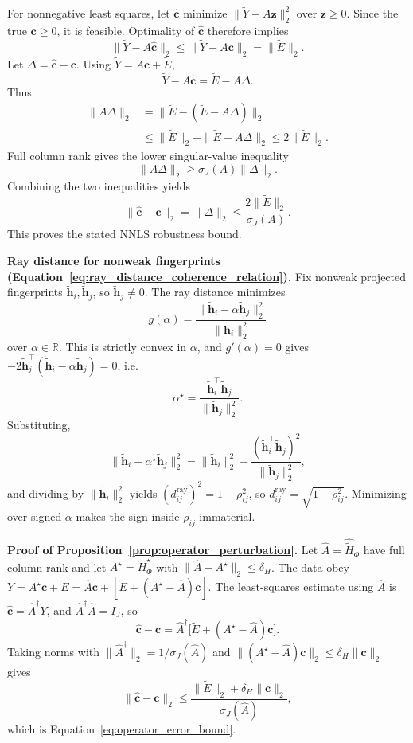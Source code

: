 For nonnegative least squares, let \(\widehat{\mathbf c}\) minimize
\(\|\widetilde Y-A\mathbf z\|_2^2\) over \(\mathbf z\ge0\).  Since the true
\(\mathbf c\ge0\), it is feasible.  Optimality of \(\widehat{\mathbf c}\)
therefore implies
\[
\|\widetilde Y-A\widehat{\mathbf c}\|_2
\le
\|\widetilde Y-A\mathbf c\|_2
=\|\widetilde E\|_2.
\]
Let \(\Delta=\widehat{\mathbf c}-\mathbf c\).  Using
\(\widetilde Y=A\mathbf c+\widetilde E\),
\[
\widetilde Y-A\widehat{\mathbf c}
=\widetilde E-A\Delta.
\]
Thus
\[
\begin{aligned}
\|A\Delta\|_2
&=\|\widetilde E-(\widetilde E-A\Delta)\|_2\\
&\le
\|\widetilde E\|_2+\|\widetilde E-A\Delta\|_2
\le
2\|\widetilde E\|_2.
\end{aligned}
\]
Full column rank gives the lower singular-value inequality
\[
\|A\Delta\|_2\ge \sigma_J(A)\|\Delta\|_2.
\]
Combining the two inequalities yields
\[
\|\widehat{\mathbf c}-\mathbf c\|_2
=\|\Delta\|_2
\le
\frac{2\|\widetilde E\|_2}{\sigma_J(A)}.
\]
This proves the stated NNLS robustness bound.

\noindent\textbf{Ray distance for nonweak fingerprints
(Equation~\ref{eq:ray_distance_coherence_relation}).}
Fix nonweak projected fingerprints \(\widetilde{\mathbf h}_i,
\widetilde{\mathbf h}_j\), so \(\widetilde{\mathbf h}_j\ne0\).  The ray distance
minimizes
\[
g(\alpha)=\frac{\|\widetilde{\mathbf h}_i-\alpha\widetilde{\mathbf h}_j\|_2^2}
{\|\widetilde{\mathbf h}_i\|_2^2}
\]
over \(\alpha\in\mathbb R\).  This is strictly convex in \(\alpha\), and
\(g'(\alpha)=0\) gives
\(-2\widetilde{\mathbf h}_j^\top(\widetilde{\mathbf h}_i-\alpha
\widetilde{\mathbf h}_j)=0\), i.e.
\[
\alpha^\star=\frac{\widetilde{\mathbf h}_i^\top\widetilde{\mathbf h}_j}
{\|\widetilde{\mathbf h}_j\|_2^2}.
\]
Substituting,
\[
\|\widetilde{\mathbf h}_i-\alpha^\star\widetilde{\mathbf h}_j\|_2^2
=\|\widetilde{\mathbf h}_i\|_2^2
-\frac{(\widetilde{\mathbf h}_i^\top\widetilde{\mathbf h}_j)^2}
{\|\widetilde{\mathbf h}_j\|_2^2},
\]
and dividing by \(\|\widetilde{\mathbf h}_i\|_2^2\) yields
\((d^{\mathrm{ray}}_{ij})^2=1-\rho_{ij}^2\), so
\(d^{\mathrm{ray}}_{ij}=\sqrt{1-\rho_{ij}^2}\).  Minimizing over signed
\(\alpha\) makes the sign inside \(\rho_{ij}\) immaterial.

\noindent\textbf{Proof of Proposition~\ref{prop:operator_perturbation}.}
Let \(\widehat A=\widehat{\widetilde H}_\Phi\) have full column rank and let
\(A^\star=\widetilde H_\Phi^\star\) with \(\|\widehat A-A^\star\|_2\le\delta_H\).
The data obey
\(\widetilde Y=A^\star\mathbf c+\widetilde E
=\widehat A\mathbf c+[\widetilde E+(A^\star-\widehat A)\mathbf c]\).
The least-squares estimate using \(\widehat A\) is
\(\widehat{\mathbf c}=\widehat A^\dagger\widetilde Y\), and
\(\widehat A^\dagger\widehat A=I_J\), so
\[
\widehat{\mathbf c}-\mathbf c
=\widehat A^\dagger\bigl[\widetilde E+(A^\star-\widehat A)\mathbf c\bigr].
\]
Taking norms with \(\|\widehat A^\dagger\|_2=1/\sigma_J(\widehat A)\) and
\(\|(A^\star-\widehat A)\mathbf c\|_2\le\delta_H\|\mathbf c\|_2\) gives
\[
\|\widehat{\mathbf c}-\mathbf c\|_2
\le\frac{\|\widetilde E\|_2+\delta_H\|\mathbf c\|_2}{\sigma_J(\widehat A)},
\]
which is Equation~\ref{eq:operator_error_bound}.

